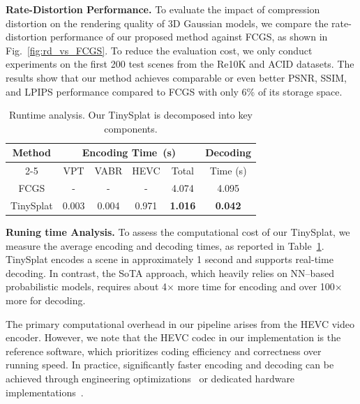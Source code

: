 \documentclass[lettersize,journal]{IEEEtran}
\begin{document}
\textbf{Rate-Distortion Performance.}
To evaluate the impact of compression distortion on the rendering quality of 3D Gaussian models, we compare the rate-distortion performance of our proposed method against FCGS, as shown in Fig.~\ref{fig:rd_vs_FCGS}. To reduce the evaluation cost, we only conduct experiments on the first 200 test scenes from the Re10K and ACID datasets. The results show that our method achieves comparable or even better PSNR, SSIM, and LPIPS performance compared to FCGS with only 6\% of its storage space.

\begin{table}[t]
  \centering
  \caption{Runtime analysis. Our TinySplat is decomposed into key components. }
    \begin{tabular}{cccccc}
    \toprule
    \multirow{2}[4]{*}{Method} & \multicolumn{4}{c}{Encoding Time~(s)} & Decoding  \\
\cmidrule{2-5}          & VPT  & VABR & HEVC  & Total & Time (s) \\
    \midrule
    FCGS  & - & - & - & 4.074    & 4.095 \\
    TinySplat  & 0.003 & 0.004 & 0.971 & \textbf{1.016} & \textbf{0.042} \\
    \bottomrule
    \end{tabular}%
  \label{tab:time}%
\end{table}%


\textbf{Runing time Analysis.}
To assess the computational cost of our TinySplat, we measure the average encoding and decoding times, as reported in Table~\ref{tab:time}. TinySplat encodes a scene in approximately 1 second and supports real-time decoding. In contrast, the SoTA approach, which heavily relies on NN–based probabilistic models, requires about 4$\times$ more time for encoding and over 100$\times$ more for decoding.

The primary computational overhead in our pipeline arises from the HEVC video encoder. However, we note that the HEVC codec in our implementation is the reference software, which prioritizes coding efficiency and correctness over running speed. In practice, significantly faster encoding and decoding can be achieved through engineering optimizations~\cite{heng2014highly} or dedicated hardware implementations~\cite{7100895, 6317152}.
\end{document}

